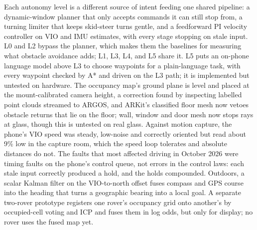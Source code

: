 Each autonomy level is a different source of intent feeding one shared pipeline: a dynamic-window planner that only accepts commands it can still stop from, a turning limiter that keeps skid-steer turns gentle, and a feedforward PI velocity controller on VIO and IMU estimates, with every stage stopping on stale input.
L0 and L2 bypass the planner, which makes them the baselines for measuring what obstacle avoidance adds; L1, L3, L4, and L5 share it.
L5 puts an on-phone language model above L3 to choose waypoints for a plain-language task, with every waypoint checked by A* and driven on the L3 path; it is implemented but untested on hardware.
The occupancy map's ground plane is level and placed at the mount-calibrated camera height, a correction found by inspecting labelled point clouds streamed to ARGOS, and ARKit's classified floor mesh now vetoes obstacle returns that lie on the floor; wall, window and door mesh now stops rays at glass, though this is untested on real glass.
Against motion capture, the phone's VIO speed was steady, low-noise and correctly oriented but read about 9\% low in the capture room, which the speed loop tolerates and absolute distances do not.
The faults that most affected driving in October 2026 were timing faults on the phone's control queue, not errors in the control laws: each stale input correctly produced a hold, and the holds compounded.
Outdoors, a scalar Kalman filter on the VIO-to-north offset fuses compass and GPS course into the heading that turns a geographic bearing into a local goal.
A separate two-rover prototype registers one rover's occupancy grid onto another's by occupied-cell voting and ICP and fuses them in log odds, but only for display; no rover uses the fused map yet.
